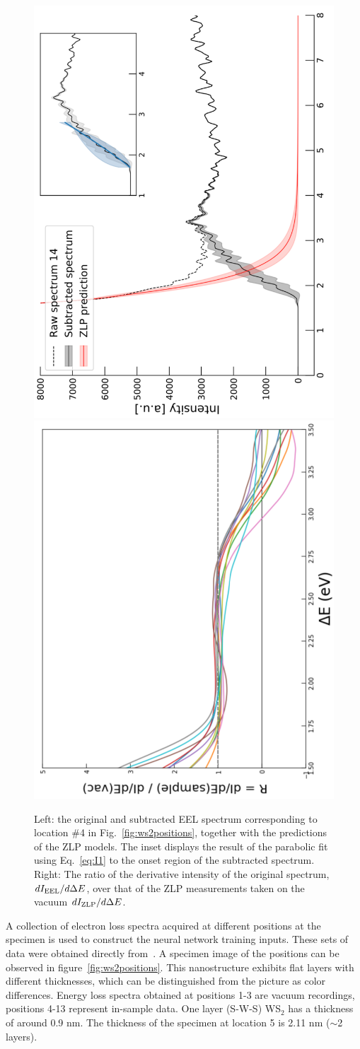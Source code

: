 \begin{figure}[t]
\begin{centering}
  \includegraphics[width=0.36\linewidth,angle=-90]{plots/sp4_subtracted_spectrum.pdf}
   \includegraphics[width=0.36\linewidth,angle=-90]{plots/derivatives.pdf}
   \caption{Left: the original
     and subtracted EEL spectrum corresponding to location \#4 in Fig.~\ref{fig:ws2positions},
     together with the predictions of the ZLP models.
     The inset displays the result of the parabolic fit using Eq.~\ref{eq:I1} to the onset
     region of the subtracted spectrum.
     Right: The ratio of the derivative intensity of the original spectrum, $dI_{\rm EEL}/d\Delta E$,
     over that of the ZLP measurements taken on the vacuum $d I_{\rm ZLP}/d\Delta E$.
  }
\label{fig:sp4_subtracted_spectrum}
\end{centering}
\end{figure}



%
A collection of electron loss spectra acquired at different positions 
at the specimen is used to construct the neural network training inputs. 
%
These sets of data were obtained directly from~\cite{SabryaWS2}.
%
A specimen image of the positions can be observed in figure~\ref{fig:ws2positions}.  
This nanostructure exhibits flat layers with different thicknesses, which 
can be distinguished from the picture as color differences.
%
Energy loss spectra obtained at positions 1-3 are vacuum recordings, 
positions 4-13 represent in-sample data.
%
One layer (S-W-S) WS$_2$ has a thickness of around 0.9 nm. 
The thickness of the specimen at location 5 is 2.11 nm ($\sim$2 layers).



